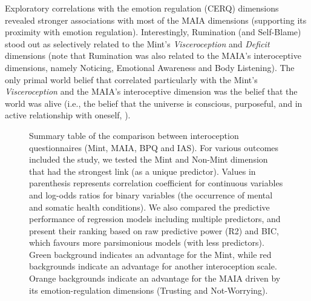 \documentclass[
  jou,
  floatsintext,
  longtable,
  nolmodern,
  notxfonts,
  notimes,
  colorlinks=true,linkcolor=blue,citecolor=blue,urlcolor=blue]{apa7}
\begin{document}
Exploratory correlations with the emotion regulation (CERQ) dimensions
revealed stronger associations with most of the MAIA dimensions
(supporting its proximity with emotion regulation). Interestingly,
Rumination (and Self-Blame) stood out as selectively related to the
Mint's \emph{Visceroception} and \emph{Deficit} dimensions (note that
Rumination was also related to the MAIA's interoceptive dimensions,
namely Noticing, Emotional Awareness and Body Listening). The only
primal world belief that correlated particularly with the Mint's
\emph{Visceroception} and the MAIA's interoceptive dimension was the
belief that the world was alive (i.e., the belief that the universe is
conscious, purposeful, and in active relationship with oneself,
).

\begin{figure}[!htbp]

{\caption{{Summary table of the comparison between interoception
questionnaires (Mint, MAIA, BPQ and IAS). For various outcomes included
the study, we tested the Mint and Non-Mint dimension that had the
strongest link (as a unique predictor). Values in parenthesis represents
correlation coefficient for continuous variables and log-odds ratios for
binary variables (the occurrence of mental and somatic health
conditions). We also compared the predictive performance of regression
models including multiple predictors, and present their ranking based on
raw predictive power (R2) and BIC, which favours more parsimonious
models (with less predictors). Green background indicates an advantage
for the Mint, while red backgrounds indicate an advantage for another
interoception scale. Orange backgrounds indicate an advantage for the
MAIA driven by its emotion-regulation dimensions (Trusting and
Not-Worrying).}{\label{fig-five}}}}


\end{figure}
\end{document}
